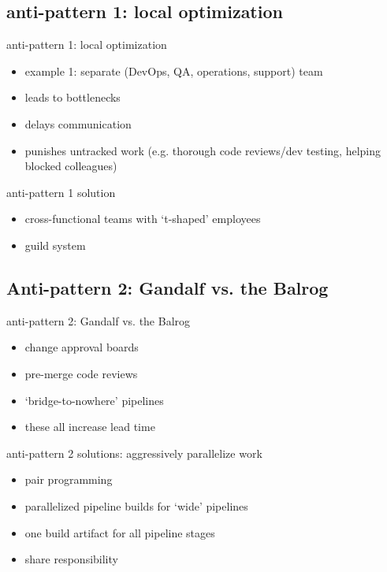 \documentclass{beamer}
\begin{document}
	\subsection{anti-pattern 1: local optimization}
	\begin{frame}{anti-pattern 1: local optimization}
		\begin{itemize}
			\item example 1: separate (DevOps, QA, operations, support) team \pause
			\item leads to bottlenecks \pause
			\item delays communication 
			\item punishes untracked work (e.g. thorough code reviews/dev testing, helping blocked colleagues)
		\end{itemize}
	\end{frame}
	\begin{frame}{anti-pattern 1 solution}
		\begin{itemize}
			\item cross-functional teams with `t-shaped' employees \pause
			\item guild system 
		\end{itemize}
	\end{frame}
	\subsection{Anti-pattern 2: Gandalf vs. the Balrog}
	\begin{frame}{anti-pattern 2: Gandalf vs. the Balrog}
		\begin{itemize}
			\item change approval boards \pause 
			\item pre-merge code reviews \pause 
			\item `bridge-to-nowhere' pipelines 
			\item these all increase lead time
		\end{itemize}
	\end{frame}
	\begin{frame}{anti-pattern 2 solutions: aggressively parallelize work}
		\begin{itemize}
			\item pair programming \pause 
			\item parallelized pipeline builds for `wide' pipelines \pause
			\item one build artifact for all pipeline stages 
			\item share responsibility
		\end{itemize}
	\end{frame}
\end{document}
